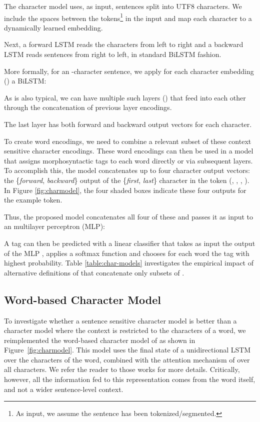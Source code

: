 \documentclass[11pt,a4paper]{article}
\begin{document}
The character model uses, as input, sentences split into UTF8 characters. We include the spaces between the tokens\footnote{As input, we assume the sentence has been tokenized/segmented.} in the input and map each character to a dynamically learned embedding.


Next, a forward LSTM reads the characters from left to right and a backward LSTM reads sentences from right to left, in standard BiLSTM fashion.

More formally, for an -character sentence, we apply for each character embedding () a BiLSTM:     


As is also typical, we can have multiple such layers () that feed into each other through the concatenation of previous layer encodings.

The last layer  has both forward  and backward  output vectors for each character. 

To create word encodings, we need to
combine a relevant subset of these context sensitive character encodings.
These word encodings can then be used in a model that assigns morphosyntactic tags to each word directly or via subsequent layers.
To accomplish this, the model concatenates up to four character output vectors: the \{\emph{forward}, \emph{backward}\} output of the \{\emph{first}, \emph{last}\} character in the token (, , , ).  In Figure \ref{fig:charmodel}, the four
shaded boxes indicate these four outputs for the example token.

Thus, the proposed model concatenates all four of these and passes it as input to an multilayer perceptron (MLP):

A tag can then be predicted with a linear classifier 
that takes as input the output of the MLP , applies a softmax function and chooses for each word the tag with highest probability. 
Table \ref{table:char-models} investigates
the empirical impact of alternative
definitions of  that concatenate only subsets of .



\subsection{Word-based Character Model}
\label{sec:word-based}

To investigate whether a sentence sensitive character model is better than a character model where the context is restricted to the characters of a word, we reimplemented the word-based character model of  as shown in  Figure~\ref{fig:charmodel}. This model uses the final state of a unidirectional LSTM over the characters of the word, combined with the attention mechanism of  over all characters. We refer the reader to those works for more details. Critically, however, all the information fed to this representation comes from the word itself, and not a wider sentence-level context.
\end{document}
